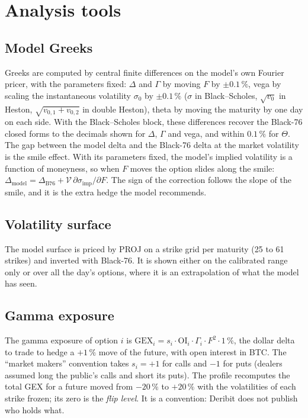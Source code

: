 \documentclass[11pt,a4paper]{article}
\theoremstyle{definition}
\theoremstyle{remark}
\begin{document}
\section{Analysis tools}\label{sec:tools}
\subsection{Model Greeks}
Greeks are computed by central finite differences on the model's own Fourier pricer, with the parameters fixed: $\Delta$ and
$\Gamma$ by moving $F$ by $\pm0.1\,\%$, vega by scaling the instantaneous volatility $\sigma_0$ by $\pm0.1\,\%$ ($\sigma$ in
Black--Scholes, $\sqrt{v_0}$ in Heston, $\sqrt{v_{0,1}+v_{0,2}}$ in double Heston), theta by moving the maturity by one day on each
side. With the Black--Scholes block, these differences recover the Black-76 closed forms to the decimals shown for $\Delta$,
$\Gamma$ and vega, and within $0.1\,\%$ for $\Theta$. The gap between the model delta and the Black-76 delta at the market
volatility is the smile effect. With its parameters fixed, the model's implied volatility is a function of moneyness, so when
$F$ moves the option slides along the smile: $\Delta_{\text{model}}=\Delta_{\text{B76}}+\mathcal V\,\partial\sigma_{\text{imp}}/\partial F$.
The sign of the correction follows the slope of the smile, and it is the extra hedge the model recommends.

\subsection{Volatility surface}
The model surface is priced by PROJ on a strike grid per maturity (25 to 61 strikes) and inverted with Black-76. It is shown
either on the calibrated range only or over all the day's options, where it is an extrapolation of what the model has seen.

\subsection{Gamma exposure}
The gamma exposure of option $i$ is $\mathrm{GEX}_i=s_i\cdot\mathrm{OI}_i\cdot\Gamma_i\cdot F^2\cdot1\,\%$, the dollar delta to trade
to hedge a $+1\,\%$ move of the future, with open interest in BTC. The ``market makers'' convention takes $s_i=+1$ for calls and
$-1$ for puts (dealers assumed long the public's calls and short its puts). The profile recomputes the total GEX for a future
moved from $-20\,\%$ to $+20\,\%$ with the volatilities of each strike frozen; its zero is the \emph{flip level}. It is a convention:
Deribit does not publish who holds what.
\end{document}
